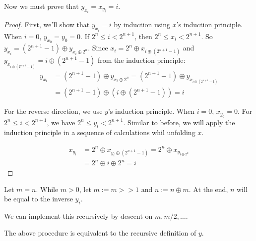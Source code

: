 \begin{theorem}
    \label{thm:recursive_inverse_is_inverse}
    Now we must prove that $y_{x_i} = x_{y_i} = i$.
\end{theorem}

\begin{proof}
    First, we'll show that $y_{x_{i}} = i$ by induction using $x$'s induction principle.
    When $i = 0$, $y_{x_0} = y_0 = 0$. If $2^n \le i < 2^{n+1}$, then $2^n \le x_i < 2^{n+1}$.
    So $y_{x_i} = (2^{n+1} - 1) \oplus y_{x_i \oplus 2^n}$. Since $x_i = 2^n \oplus x_{i \oplus (2^{n+1} - 1)}$ and $y_{x_{i \oplus (2^{n+1} - 1)}} = i \oplus (2^{n+1} - 1)$ from the induction principle:
    \begin{align*}
        y_{x_i} &= (2^{n+1} - 1) \oplus y_{x_i \oplus 2^n} = (2^{n+1} - 1) \oplus y_{x_{i \oplus (2^{n+1} - 1)}} \\
        &= (2^{n+1} - 1) \oplus (i \oplus (2^{n+1} - 1)) = i
    \end{align*}

    For the reverse direction, we use $y$'s induction principle.
    When $i = 0$, $x_{y_0} = 0$. For $2^n \le i < 2^{n+1}$, we have $2^n \le y_i < 2^{n+1}$.
    Similar to before, we will apply the induction principle in a sequence of calculations whil unfolding $x$.

    \begin{align*}
        x_{y_i} &= 2^n \oplus x_{y_i \oplus (2^{n+1} - 1)} = 2^n \oplus x_{y_{i \oplus 2^n}} \\
        &= 2^n \oplus i \oplus 2^n = i
    \end{align*}
\end{proof}

\begin{definition}
    \label{def:computable_inverse}
    
    Let $m = n$. While $m > 0$, let $m := m >> 1$ and $n := n \oplus m$.
    At the end, $n$ will be equal to the inverse $y_i$.

    We can implement this recursively by descent on $m, m/2, \ldots$.
\end{definition}

\begin{theorem}
    \label{thm:computable_inverse_is_equivalent}

    The above procedure is equivalent to the recursive definition of $y$.
\end{theorem}

